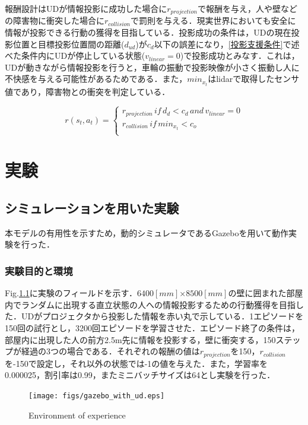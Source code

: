 \documentclass[12pt]{sonota/aislab}
\begin{document}
報酬設計はUDが情報投影に成功した場合に$r_{projection}$で報酬を与え，人や壁などの障害物に衝突した場合に$r_{collision}$で罰則を与える．現実世界においても安全に情報が投影できる行動の獲得を目指している．投影成功の条件は，UDの現在投影位置と目標投影位置間の距離($d_{ud}$)が$c_{d}$以下の誤差になり，\ref{投影支援条件}で述べた条件内にUDが停止している状態($v_{linear}=0$)で投影成功とみなす．これは，UDが動きながら情報投影を行うと，車輪の振動で投影映像が小さく振動し人に不快感を与える可能性があるためである．また，$min_{x_t}$はlidarで取得したセンサ値であり，障害物との衝突を判定している．

\begin{equation}
r(s_{t},a_{t})= \left \{
\begin{array}{l}
r_{projection}\,if\,d_{d}<c_{d}\,and\,v_{linear}=0 \\
r_{collision}\,if\,min_{x_{t}} < c_{o} \\
\end{array}
\right.
\end{equation}

\chapter{実験}
\section{シミュレーションを用いた実験}
本モデルの有用性を示すため，動的シミュレータであるGazeboを用いて動作実験を行った．

\subsection{実験目的と環境}
Fig.\ref{gazebo}に実験のフィールドを示す．$6400[mm]$×$8500[mm]$の壁に囲まれた部屋内でランダムに出現する直立状態の人への情報投影するための行動獲得を目指した．UDがプロジェクタから投影した情報を赤い丸で示している．1エピソードを150回の試行とし，3200回エピソードを学習させた．エピソード終了の条件は，部屋内に出現した人の前方2.5m先に情報を投影する，壁に衝突する，150ステップが経過の3つの場合である．それぞれの報酬の値は$r_{projection}$を150，$r_{collision}$を-150で設定し，それ以外の状態では-1の値を与えた．また，学習率を0.000025，割引率は0.99，またミニバッチサイズは64とし実験を行った．


\begin{figure}[t]
\begin{center}
\texttt{[image: figs/gazebo\_with\_ud.eps]}
\caption{Environment of experience}
\label{gazebo}
\end{center}
\end{figure}
\end{document}
